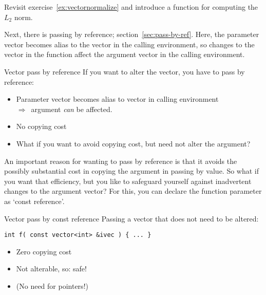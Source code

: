 \begin{exercise}
  \label{ex:vectornormalize-function}
  Revisit exercise~\ref{ex:vectornormalize} and introduce a function
  for computing the $L_2$ norm.
\end{exercise}

Next, there is passing by reference; section~\ref{sec:pass-by-ref}.
Here, the parameter vector becomes alias to the vector in the calling environment,
so changes to the vector in the function affect the argument vector
in the calling environment.



\begin{slide}{Vector pass by reference}
  \label{sl:vector-arg-ref}
  If you want to alter the vector, you have to pass by reference:
  \begin{itemize}
  \item Parameter vector becomes alias to vector in calling environment\\
    $\Rightarrow$~argument \emph{can} be affected.
  \item No copying cost
  \item What if you want to avoid copying cost, but need not alter the argument?
  \end{itemize}
\end{slide}

An important reason for wanting to pass by reference is that it avoids
the possibly substantial cost in copying the argument in passing by value.
So what if you want that efficiency, but you like to safeguard yourself
against inadvertent changes to the argument vector?
For this, you can declare the function parameter as `const reference'.

\begin{block}{Vector pass by const reference}
  \label{sl:vector-const-ref}
  Passing a vector that does not need to be altered:
\begin{lstlisting}
int f( const vector<int> &ivec ) { ... }    
\end{lstlisting}
\begin{itemize}
\item Zero copying cost
\item Not alterable, so: safe!
\item (No need for pointers!)
\end{itemize}
\end{block}

